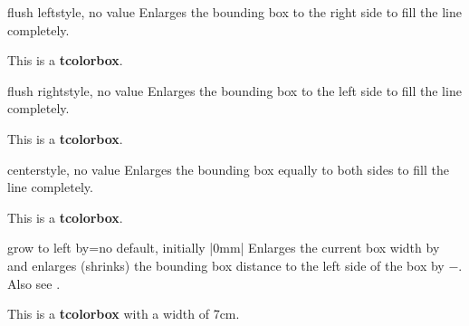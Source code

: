 \begin{docTcbKey}[][doc new=2015-11-20]{flush left}{}{style, no value}
  Enlarges the bounding box to the right side to fill the line completely.
\begin{dispExample}

\begin{tcolorbox}[flush left,width=5cm,enhanced,show bounding box]
This is a \textbf{tcolorbox}.
\end{tcolorbox}
\end{dispExample}
\end{docTcbKey}


\begin{docTcbKey}[][doc new=2015-11-20]{flush right}{}{style, no value}
  Enlarges the bounding box to the left side to fill the line completely.
\begin{dispExample}

\begin{tcolorbox}[flush right,width=5cm,enhanced,show bounding box]
This is a \textbf{tcolorbox}.
\end{tcolorbox}
\end{dispExample}
\end{docTcbKey}


\begin{docTcbKey}[][doc new=2015-11-20]{center}{}{style, no value}
  Enlarges the bounding box equally to both sides to fill the line completely.
\begin{dispExample}

\begin{tcolorbox}[center,width=5cm,enhanced,show bounding box]
This is a \textbf{tcolorbox}.
\end{tcolorbox}
\end{dispExample}
\end{docTcbKey}

\clearpage
\begin{docTcbKey}{grow to left by}{=}{no default, initially |0mm|}
  Enlarges the current box width by  and
  enlarges (shrinks) the bounding box distance to the left side of the box by
  $-$. Also see .
\begin{dispExample}

\begin{tcolorbox}[width=5cm,grow to left by=2cm,enhanced,show bounding box]
This is a \textbf{tcolorbox} with a width of 7cm.
\end{tcolorbox}
\end{dispExample}
\end{docTcbKey}

